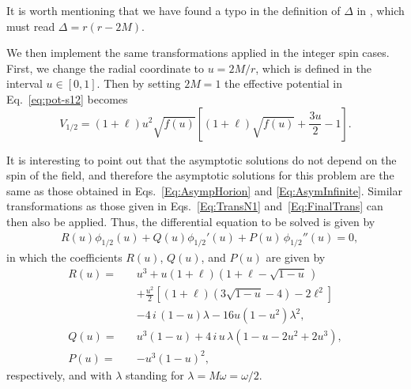 It is worth mentioning that we have found a typo in the definition of $\Delta$ in \cite{Cho:2003qe}, which must read $\Delta=r(r-2M)$.

We then implement the same transformations applied in the integer spin cases. First, we change the radial coordinate to $u=2M/r$, which is defined in the interval $u\in[0,1]$. Then by setting $2M=1$ the effective potential in Eq.~\eqref{eq:pot-s12} becomes
%
\begin{equation}
  \!\!V_{\scriptscriptstyle{1/2}}=\left(1+\ell\right)u^2\sqrt{f(u)} \left[\left(1+\ell\right)\sqrt{f(u)}+\frac{3u}{2} -1\right].
\end{equation}

It is interesting to point out that the asymptotic solutions do not depend on the spin of the field, and therefore the asymptotic solutions for this problem are the same as those obtained in Eqs.~\eqref{Eq:AsympHorion} and \eqref{Eq:AsymInfinite}. Similar transformations as those given in Eqs.~\eqref{Eq:TransN1} and~\eqref{Eq:FinalTrans} can then also be applied. Thus, the differential equation to be solved is given by
%
\begin{equation}\label{eq:onda-s12}
  \begin{split}
    &R(u)\phi_{\scriptscriptstyle{1/2}}(u) + Q(u)\phi_{\scriptscriptstyle{1/2}}'(u) + P(u) \,\phi_{\scriptscriptstyle{1/2}}''(u)=0,
  \end{split}
\end{equation}
%
in which the coefficients $R(u)$, $Q(u)$, and $P(u)$ are given by
%
\begin{eqnarray}
  R(u)=\,&& u^3+u(1+\ell)\left(1+\ell-\sqrt{1-u}\, \right) \nonumber \\
  && +\frac{u^2}{2}\left[(1+\ell)\left(3\sqrt{1-u}-4\right)-2\ell^2\right]\nonumber \\
  &&-4\,i\,(1-u)\lambda-16u(1-u^2)\lambda^2,\\
  Q(u) = && u^3(1-u)+4\,i\,u\, \lambda\left(1-u-2u^2+2u^3\right), \\
  P(u)  =&& -u^3(1-u)^2,
\end{eqnarray}
%
respectively, and with $\lambda$ standing for $\lambda=M\omega=\omega/2$.

